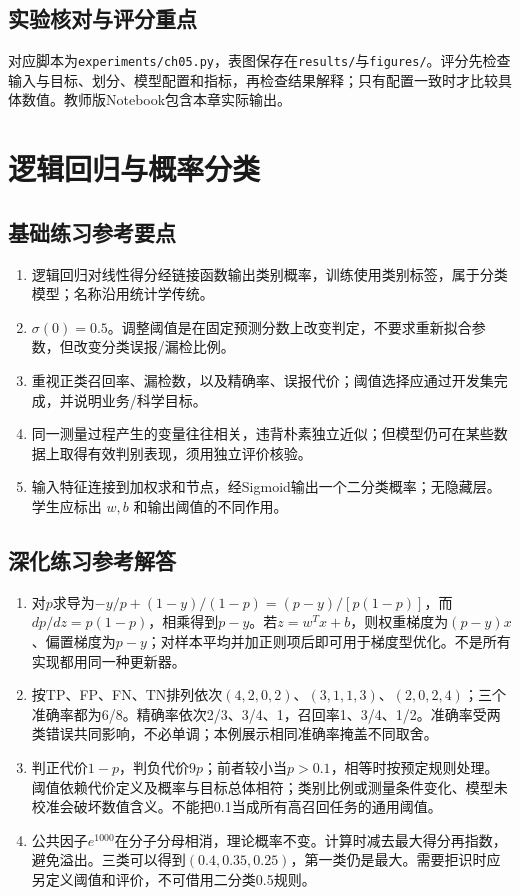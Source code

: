 \section*{实验核对与评分重点}
对应脚本为\texttt{experiments/ch05.py}，表图保存在\texttt{results/}与\texttt{figures/}。评分先检查输入与目标、划分、模型配置和指标，再检查结果解释；只有配置一致时才比较具体数值。教师版Notebook包含本章实际输出。

\chapter{逻辑回归与概率分类}
\section*{基础练习参考要点}
\begin{enumerate}[label=\arabic*.]
\item 逻辑回归对线性得分经链接函数输出类别概率，训练使用类别标签，属于分类模型；名称沿用统计学传统。
\item $\sigma(0)=0.5$。调整阈值是在固定预测分数上改变判定，不要求重新拟合参数，但改变分类误报/漏检比例。
\item 重视正类召回率、漏检数，以及精确率、误报代价；阈值选择应通过开发集完成，并说明业务/科学目标。
\item 同一测量过程产生的变量往往相关，违背朴素独立近似；但模型仍可在某些数据上取得有效判别表现，须用独立评价核验。
\item 输入特征连接到加权求和节点，经Sigmoid输出一个二分类概率；无隐藏层。学生应标出 $w,b$ 和输出阈值的不同作用。
\end{enumerate}
\section*{深化练习参考解答}
\begin{enumerate}[label=D\arabic*.]
\item 对$p$求导为$-y/p+(1-y)/(1-p)=(p-y)/[p(1-p)]$，而$dp/dz=p(1-p)$，相乘得到$p-y$。若$z=w^Tx+b$，则权重梯度为$(p-y)x$、偏置梯度为$p-y$；对样本平均并加正则项后即可用于梯度型优化。不是所有实现都用同一种更新器。
\item 按TP、FP、FN、TN排列依次$(4,2,0,2)$、$(3,1,1,3)$、$(2,0,2,4)$；三个准确率都为6/8。精确率依次2/3、3/4、1，召回率1、3/4、1/2。准确率受两类错误共同影响，不必单调；本例展示相同准确率掩盖不同取舍。
\item 判正代价$1-p$，判负代价$9p$；前者较小当$p>0.1$，相等时按预定规则处理。阈值依赖代价定义及概率与目标总体相符；类别比例或测量条件变化、模型未校准会破坏数值含义。不能把0.1当成所有高召回任务的通用阈值。
\item 公共因子$e^{1000}$在分子分母相消，理论概率不变。计算时减去最大得分再指数，避免溢出。三类可以得到$(0.4,0.35,0.25)$，第一类仍是最大。需要拒识时应另定义阈值和评价，不可借用二分类0.5规则。
\end{enumerate}

